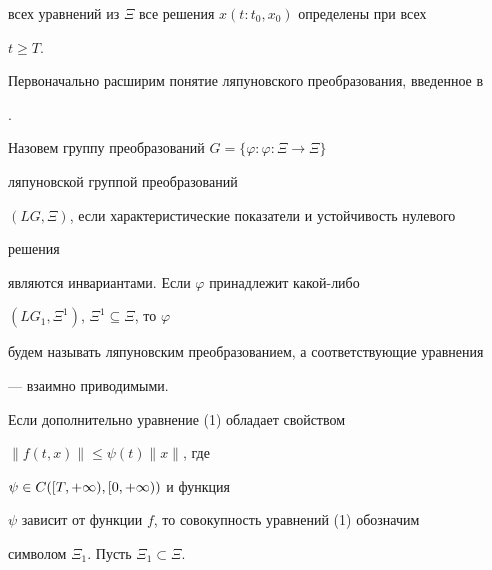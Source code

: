 всех уравнений из $\Xi$ все решения $x(t:t_0,x_0)$ определены при всех 


$t\ge T$. 


 


Первоначально расширим понятие ляпуновского преобразования, введенное в 


\cite{1}. 


 


\begin{defnnonum} 


Назовем группу преобразований $G=\{\varphi:\varphi:\Xi\to\Xi\}$ 


ляпуновской группой преобразований 


$(LG,\Xi)$, если характеристические показатели и устойчивость нулевого 


решения 


являются инвариантами. Если $\varphi$ принадлежит какой-либо 


$(LG_1,\Xi^1)$, $\Xi^1\subseteq\Xi$, то $\varphi$ 


будем называть ляпуновским преобразованием, а соответствующие уравнения 


--- взаимно приводимыми. 


\end{defnnonum} 


 


Если дополнительно уравнение (1) обладает свойством 


$\|f(t,x)\|\le\psi(t)\|x\|$, где 


$\psi\in\linebreak C([T,+\infty),[0,+\infty))$ и функция 


$\psi$ зависит от функции $f$, то совокупность уравнений (1) обозначим 


символом $\Xi_1$. Пусть $\Xi_1\subset\Xi$. 


 


